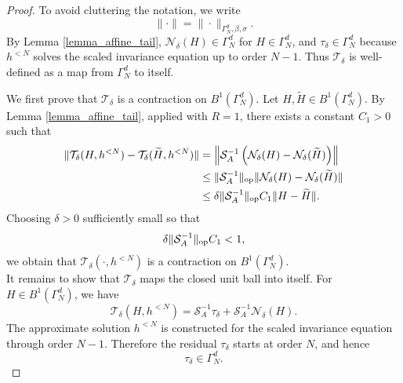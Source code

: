 \documentclass{amsart}
\theoremstyle{plain}
\theoremstyle{definition}
\begin{document}
\begin{proof}
To avoid cluttering the notation, we write
\begin{equation}
        \|\cdot\|=\|\cdot\|_{\Gamma_N^d,\beta,\sigma}.
\end{equation}
By Lemma \ref{lemma_affine_tail}, $\mathcal N_\delta(H)\in\Gamma_N^d$ for
$H\in\Gamma_N^d$, and $\tau_\delta\in\Gamma_N^d$ because $h^{<N}$ solves the scaled
invariance equation up to order $N-1$. Thus $\mathcal T_\delta$ is well-defined as a map
from $\Gamma_N^d$ to itself.

We first prove that $\mathcal T_\delta$ is a contraction on $B^1(\Gamma_N^d)$. Let
$H,\widetilde H\in B^1(\Gamma_N^d)$. By Lemma \ref{lemma_affine_tail}, applied with
$R=1$, there exists a constant $C_1>0$ such that
\begin{equation}\label{contraction_revised}
\begin{split}
        \|\mathcal T_\delta(H,h^{<N})-\mathcal T_\delta(\widetilde H,h^{<N})\|
        &=
        \left\|
        \mathcal S_A^{-1}
        \left(
        \mathcal N_\delta(H)-\mathcal N_\delta(\widetilde H)
        \right)
        \right\| \\
        &\le
        \|\mathcal S_A^{-1}\|_{\rm op}
        \|\mathcal N_\delta(H)-\mathcal N_\delta(\widetilde H)\| \\
        &\le
        \delta
        \|\mathcal S_A^{-1}\|_{\rm op}
        C_1
        \|H-\widetilde H\|.
\end{split}
\end{equation}
Choosing $\delta>0$ sufficiently small so that
\begin{equation}
        \delta
        \|\mathcal S_A^{-1}\|_{\rm op}
        C_1
        <1,
\end{equation}
we obtain that $\mathcal T_\delta(\cdot,h^{<N})$ is a contraction on
$B^1(\Gamma_N^d)$.\\
It remains to show that $\mathcal T_\delta$ maps the closed unit ball into itself. For
$H\in B^1(\Gamma_N^d)$, we have
\begin{equation}\label{ball_revised}
        \mathcal T_\delta(H,h^{<N})
        =
        \mathcal S_A^{-1}\tau_\delta
        +
        \mathcal S_A^{-1}\mathcal N_\delta(H).
\end{equation}
The approximate solution $h^{<N}$ is constructed for the scaled
invariance equation through order $N-1$. Therefore the residual $\tau_\delta$ starts at order $N$, and hence
\begin{equation}
    \tau_\delta\in\Gamma_N^d.

\end{equation}
\end{proof}
\end{document}

